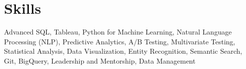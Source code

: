 \section{Skills}
  \begin{itemize}[leftmargin=0.1in, label={}]
    \normalsize{\item{
      Advanced SQL, Tableau, Python for Machine Learning, Natural Language Processing (NLP), Predictive Analytics, A/B Testing, Multivariate Testing, Statistical Analysis, Data Visualization, Entity Recognition, Semantic Search, Git, BigQuery, Leadership and Mentorship, Data Management \\
     }}
  \end{itemize}